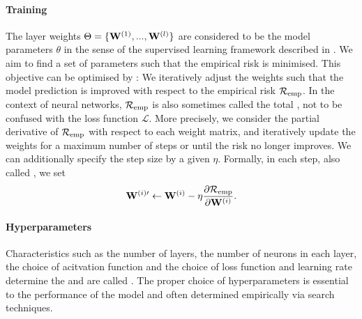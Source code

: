 \documentclass[
	fontsize=10pt, %
	twoside=false, %
	secnumdepth=1, %
  toc=indentunnumbered %
]{kaobook}
\begin{document}
\paragraph{Training} The layer weights $\Theta = \{\mathbf{W}^{(1)}, ...,
\mathbf{W}^{(l)}\}$ are considered to be the model parameters $\theta$ in the sense
of the supervised learning framework described in .
We aim to find a set of parameters such that the empirical risk is minimised.
This objective can be
optimised by : We iteratively adjust the weights
such that the model prediction is improved with respect to the empirical risk
$\mathcal{R}_{\text{emp}}$. In the context of neural networks, $\mathcal{R}_{\text{emp}}$ is also sometimes called the
total , not to be confused with the loss function $\mathcal{L}$. More
precisely, we consider the partial derivative of $\mathcal{R}_{\text{emp}}$ with respect to each
weight matrix, and iteratively update the weights for a maximum number of steps
or until the risk no longer improves. We can additionally specify the step size
by a given  $\eta$. Formally, in each step, also called
, we set
\begin{align*}
\mathbf{W}^{(i)\prime} \gets
\mathbf{W}^{(i)} - \eta \frac{\partial \mathcal{R}_{\text{emp}}}{\partial \mathbf{W}^{(i)}}.
\end{align*}

\paragraph{Hyperparameters} Characteristics such as the number of layers, the
number of neurons in each layer, the choice of acitvation function and the
choice of loss function and learning rate determine the 
and are called . The proper choice of hyperparameters is
essential to the performance of the model and often determined empirically via
search techniques.
\end{document}
